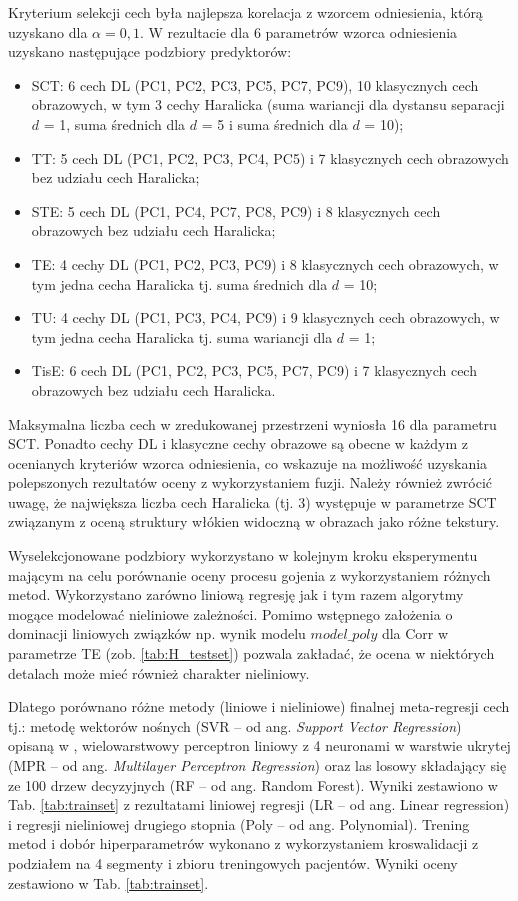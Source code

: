 Kryterium selekcji cech była najlepsza korelacja z wzorcem odniesienia, którą uzyskano dla $\alpha=0,1$. W rezultacie dla 6 parametrów wzorca odniesienia uzyskano następujące podzbiory predyktorów:  
\begin{itemize}
	\item SCT: 6 cech DL (PC1, PC2, PC3, PC5, PC7, PC9), 10 klasycznych cech obrazowych, w tym 3 cechy Haralicka (suma wariancji dla dystansu separacji $d$ = 1, suma średnich dla $d$ = 5 i suma średnich dla $d$ = 10);
	\item TT: 5 cech DL (PC1, PC2, PC3, PC4, PC5) i 7 klasycznych cech obrazowych bez udziału cech Haralicka;
	\item STE: 5 cech DL (PC1, PC4, PC7, PC8, PC9) i 8 klasycznych cech obrazowych bez udziału cech Haralicka;
	\item TE: 4 cechy DL (PC1, PC2, PC3, PC9) i 8 klasycznych cech obrazowych, w tym jedna cecha Haralicka tj. suma średnich dla $d$ = 10;
	\item TU: 4 cechy DL (PC1, PC3, PC4, PC9) i 9 klasycznych cech obrazowych, w tym jedna cecha Haralicka tj. suma wariancji dla $d$ = 1;  
	\item TisE: 6 cech DL (PC1, PC2, PC3, PC5, PC7, PC9) i 7 klasycznych cech obrazowych bez udziału cech Haralicka.
	
\end{itemize}
Maksymalna liczba cech w zredukowanej przestrzeni wyniosła 16 dla parametru SCT. Ponadto cechy DL i klasyczne cechy obrazowe są obecne w każdym z ocenianych kryteriów wzorca odniesienia, co wskazuje na możliwość uzyskania polepszonych rezultatów oceny z wykorzystaniem fuzji. Należy również zwrócić uwagę, że największa liczba cech Haralicka (tj. 3) występuje w parametrze SCT związanym z oceną struktury włókien widoczną w obrazach jako różne tekstury.

Wyselekcjonowane podzbiory wykorzystano w kolejnym kroku eksperymentu mającym na celu porównanie oceny procesu gojenia z wykorzystaniem różnych metod. Wykorzystano zarówno liniową regresję jak i tym razem algorytmy mogące modelować nieliniowe zależności. Pomimo wstępnego założenia o dominacji liniowych związków np. wynik modelu $model\_poly$ dla Corr w parametrze TE (zob. \ref{tab:H_testset}) pozwala zakładać, że ocena w niektórych detalach może mieć również charakter nieliniowy. 

Dlatego porównano różne metody (liniowe i nieliniowe) finalnej meta-regresji cech tj.: metodę wektorów nośnych (SVR -- od ang. \textit{Support Vector Regression}) opisaną w \cite{SVR_drucker}, wielowarstwowy perceptron liniowy z 4 neuronami w warstwie ukrytej (MPR -- od ang. \textit{Multilayer Perceptron Regression}) oraz las losowy składający się ze 100 drzew decyzyjnych (RF -- od ang. Random Forest). Wyniki zestawiono w Tab. \ref{tab:trainset} z rezultatami liniowej regresji (LR -- od ang. Linear regression) i regresji nieliniowej drugiego stopnia (Poly -- od ang. Polynomial). Trening metod i dobór hiperparametrów wykonano z wykorzystaniem kroswalidacji z podziałem na 4 segmenty i zbioru treningowych pacjentów. Wyniki oceny zestawiono w Tab. \ref{tab:trainset}.

